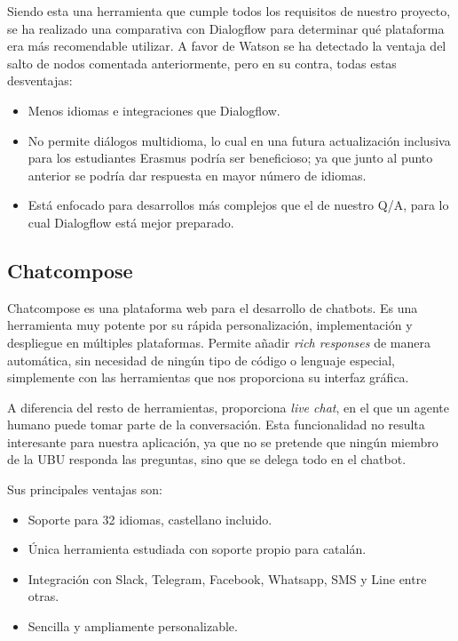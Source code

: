 Siendo esta una herramienta que cumple todos los requisitos de nuestro proyecto, se ha realizado una comparativa con Dialogflow para determinar qué plataforma era más recomendable utilizar.
A favor de Watson se ha detectado la ventaja del salto de nodos comentada anteriormente, pero en su contra, todas estas desventajas:
\begin{itemize}
	\item Menos idiomas e integraciones que Dialogflow.
	\item No permite diálogos multidioma, lo cual en una futura actualización inclusiva para los estudiantes Erasmus podría ser beneficioso; ya que junto al punto anterior se podría dar respuesta en mayor número de idiomas.
	\item Está enfocado para desarrollos más complejos que el de nuestro Q/A, para lo cual Dialogflow está mejor preparado.
\end{itemize}
 
 
\newpage

\subsection{Chatcompose \cite{ChatCompose}} 

Chatcompose es una plataforma web para el desarrollo de chatbots.
Es una herramienta muy potente por su rápida personalización, implementación y despliegue en múltiples plataformas.  
Permite añadir \textit{rich responses} de manera automática, sin necesidad de ningún tipo de código o lenguaje especial, simplemente con las herramientas que nos proporciona su interfaz gráfica.

A diferencia del resto de herramientas, proporciona \textit{live chat}, en el que un agente humano puede tomar parte de la conversación. Esta funcionalidad no resulta interesante para nuestra aplicación, ya que no se pretende que ningún miembro de la UBU responda las preguntas, sino que se delega todo en el chatbot.

Sus principales ventajas son:
\begin{itemize}
	\item Soporte para 32 idiomas, castellano incluido.
	\item Única herramienta estudiada con soporte propio para catalán.
	\item Integración con Slack, Telegram, Facebook, Whatsapp, SMS y Line entre otras.
	\item Sencilla y ampliamente personalizable. 
	
\end{itemize}

